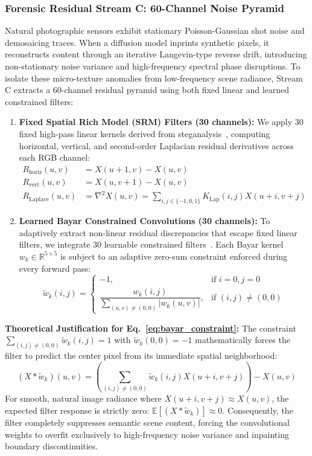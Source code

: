 \subsubsection{Forensic Residual Stream C: 60-Channel Noise Pyramid}
Natural photographic sensors exhibit stationary Poisson-Gaussian shot noise and demosaicing traces. When a diffusion model inprints synthetic pixels, it reconstructs content through an iterative Langevin-type reverse drift, introducing non-stationary noise variance and high-frequency spectral phase disruptions. To isolate these micro-texture anomalies from low-frequency scene radiance, Stream C extracts a 60-channel residual pyramid using both fixed linear and learned constrained filters:
\begin{enumerate}
    \item \textbf{Fixed Spatial Rich Model (SRM) Filters (30 channels):} We apply 30 fixed high-pass linear kernels derived from steganalysis~\cite{srm}, computing horizontal, vertical, and second-order Laplacian residual derivatives across each RGB channel:
    \begin{align}
        R_{\mathrm{horiz}}(u, v) &= X(u+1, v) - X(u, v) \\
        R_{\mathrm{vert}}(u, v) &= X(u, v+1) - X(u, v) \\
        R_{\mathrm{Laplace}}(u, v) &= \nabla^2 X(u, v) = \sum_{i, j \in \{-1, 0, 1\}} K_{\mathrm{Lap}}(i, j) X(u+i, v+j)
    \end{align}
    \item \textbf{Learned Bayar Constrained Convolutions (30 channels):} To adaptively extract non-linear residual discrepancies that escape fixed linear filters, we integrate 30 learnable constrained filters~\cite{bayar}. Each Bayar kernel $w_k \in \mathbb{R}^{5 \times 5}$ is subject to an adaptive zero-sum constraint enforced during every forward pass:
    \begin{equation}
        \tilde{w}_k(i, j) = 
        \begin{cases}
            -1, & \text{if } i = 0, j = 0 \\
            \dfrac{w_k(i, j)}{\sum_{(u, v) \neq (0, 0)} |w_k(u, v)|}, & \text{if } (i, j) \neq (0, 0)
        \end{cases}
        \label{eq:bayar_constraint}
    \end{equation}
\end{enumerate}
\noindent\textbf{Theoretical Justification for Eq.~\eqref{eq:bayar_constraint}:} The constraint $\sum_{(i, j) \neq (0, 0)} \tilde{w}_k(i, j) = 1$ with $\tilde{w}_k(0, 0) = -1$ mathematically forces the filter to predict the center pixel from its immediate spatial neighborhood:
\begin{equation}
    (X * \tilde{w}_k)(u, v) = \left( \sum_{(i, j) \neq (0, 0)} \tilde{w}_k(i, j) X(u+i, v+j) \right) - X(u, v)
\end{equation}
For smooth, natural image radiance where $X(u+i, v+j) \approx X(u, v)$, the expected filter response is strictly zero: $\mathbb{E}[(X * \tilde{w}_k)] \approx 0$. Consequently, the filter completely suppresses semantic scene content, forcing the convolutional weights to overfit exclusively to high-frequency noise variance and inpainting boundary discontinuities.


